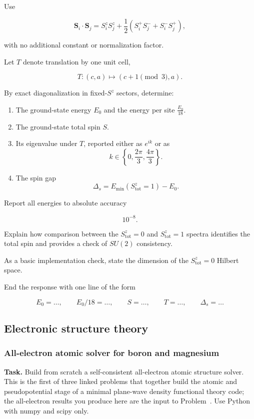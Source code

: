 Use

$$
\mathbf{S}_i\cdot\mathbf{S}_j
=
S_i^z S_j^z
+
\frac{1}{2}
\left(
S_i^+S_j^-+S_i^-S_j^+
\right),
$$

with no additional constant or normalization factor.

Let \(T\) denote translation by one unit cell,

$$
T:(c,a)\longmapsto(c+1\!\!\!\pmod{3},a).
$$

By exact diagonalization in fixed-\(S^z\) sectors, determine:
\begin{enumerate}
\item The ground-state energy \(E_0\) and the energy per site
\(    \frac{E_0}{18}.
   \)


\item The ground-state total spin \(S\).

\item Its eigenvalue under \(T\), reported either as \(e^{ik}\) or as
\[
k\in
\left\{
0,\frac{2\pi}{3},\frac{4\pi}{3}
\right\}.
\]

\item The spin gap
\[
\Delta_s
=
E_{\min}\!\left(S^z_{\mathrm{tot}}=1\right)-E_0.
\]


\end{enumerate}

Report all energies to absolute accuracy

$$
10^{-8}.
$$

Explain how comparison between the \(S^z_{\mathrm{tot}}=0\) and
\(S^z_{\mathrm{tot}}=1\) spectra identifies the total spin and provides a
check of \(SU(2)\) consistency.

As a basic implementation check, state the dimension of the
\(S^z_{\mathrm{tot}}=0\) Hilbert space.

End the response with one line of the form

$$
\boxed{
E_0=\ldots,\qquad
E_0/18=\ldots,\qquad
S=\ldots,\qquad
T=\ldots,\qquad
\Delta_s=\ldots
}
$$







\subsection{Electronic structure theory}
\label{problems:electronic-structure}

\subsubsection{All-electron atomic solver for boron and magnesium}
\label{problem:all-electron-atomic-solver}
\textbf{Task.} Build from scratch a self-consistent all-electron atomic structure solver. This is the first of
three linked problems that together build the atomic and pseudopotential stage of a minimal plane-wave density
functional theory code; the all-electron results you produce here are the input to Problem~. Use Python with
numpy and scipy only.

